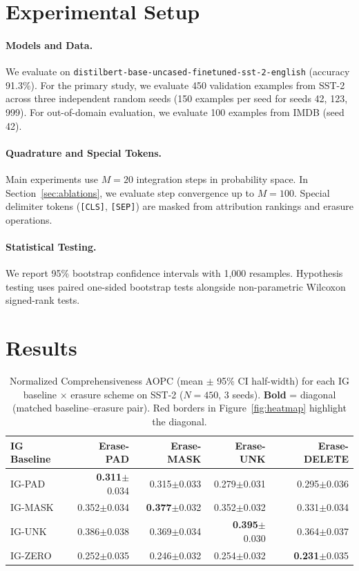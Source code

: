 \documentclass[11pt]{article}
\begin{document}
\section{Experimental Setup}
\label{sec:setup}

\paragraph{Models and Data.}
We evaluate on \texttt{distilbert-base-uncased-finetuned-sst-2-english} (accuracy 91.3\%). For the primary study, we evaluate 450 validation examples from SST-2 across three independent random seeds (150 examples per seed for seeds 42, 123, 999). For out-of-domain evaluation, we evaluate 100 examples from IMDB (seed 42).

\paragraph{Quadrature and Special Tokens.}
Main experiments use $M=20$ integration steps in probability space. In Section~\ref{sec:ablations}, we evaluate step convergence up to $M=100$. Special delimiter tokens (\texttt{[CLS]}, \texttt{[SEP]}) are masked from attribution rankings and erasure operations.

\paragraph{Statistical Testing.}
We report 95\% bootstrap confidence intervals with 1,000 resamples. Hypothesis testing uses paired one-sided bootstrap tests alongside non-parametric Wilcoxon signed-rank tests.

\section{Results}
\label{sec:results}

\begin{table}[t]
\centering
\small
\begin{tabular}{lrrrr}
\toprule
\textbf{IG Baseline} & \textbf{Erase-PAD} & \textbf{Erase-MASK} & \textbf{Erase-UNK} & \textbf{Erase-DELETE} \\
\midrule
IG-PAD & \textbf{0.311}$\pm$0.034 & 0.315$\pm$0.033 & 0.279$\pm$0.031 & 0.295$\pm$0.036 \\
IG-MASK & 0.352$\pm$0.034 & \textbf{0.377}$\pm$0.032 & 0.352$\pm$0.032 & 0.331$\pm$0.034 \\
IG-UNK & 0.386$\pm$0.038 & 0.369$\pm$0.034 & \textbf{0.395}$\pm$0.030 & 0.364$\pm$0.037 \\
IG-ZERO & 0.252$\pm$0.035 & 0.246$\pm$0.032 & 0.254$\pm$0.032 & \textbf{0.231}$\pm$0.035 \\
\bottomrule
\end{tabular}
\caption{Normalized Comprehensiveness AOPC (mean $\pm$ 95\% CI half-width) for each IG baseline $\times$ erasure scheme on SST-2 ($N=450$, 3 seeds). \textbf{Bold} = diagonal (matched baseline--erasure pair). Red borders in Figure~\ref{fig:heatmap} highlight the diagonal.}
\label{tab:4x4}
\end{table}
\end{document}
